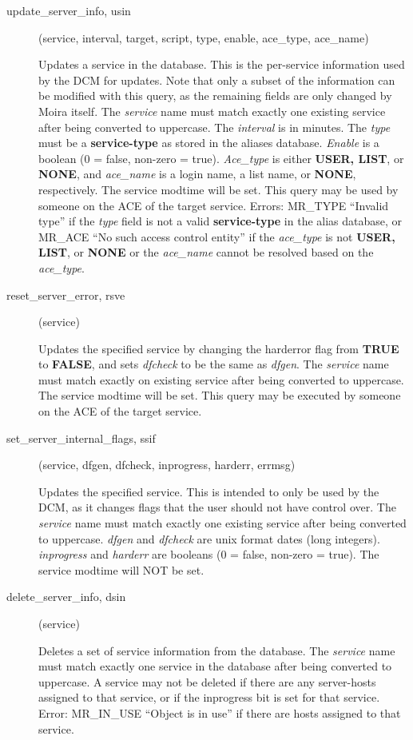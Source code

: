 \begin{description}
\item[update\_server\_info, usin](service, interval, target, script, type,
enable, ace\_type, ace\_name)

Updates a service in the database.  This is the per-service
information used by the DCM for updates.  Note that only a subset of
the information can be modified with this query, as the remaining
fields are only changed by Moira itself.  The {\em service} name must
match exactly one existing service after being converted to uppercase.
The {\em interval} is in minutes.  The {\em type} must be a
{\bf service-type} as stored in the aliases database.  {\em Enable} is a
boolean (0 = false, non-zero = true).  {\em Ace\_type} is either {\bf USER,
LIST}, or {\bf NONE}, and {\em ace\_name} is a login name, a list name, or
{\bf NONE}, respectively.  The service modtime will be set.  This query
may be used by someone on the ACE of the target service.  Errors:
MR\_TYPE ``Invalid type'' if the {\em type} field is not a valid
{\bf service-type} in the alias database, or MR\_ACE ``No such access
control entity'' if the {\em ace\_type} is not {\bf USER, LIST}, or {\bf NONE}
or the {\em ace\_name} cannot be resolved based on the {\em ace\_type}.

\item[reset\_server\_error, rsve](service)

Updates the specified service by changing the harderror flag from
{\bf TRUE} to {\bf FALSE}, and sets {\em dfcheck} to be the same as
{\em dfgen}.  The {\em service} name must match exactly on existing
service after being converted to uppercase.  The service modtime will
be set.  This query may be executed by someone on the ACE of the
target service.

\item[set\_server\_internal\_flags, ssif](service, dfgen, dfcheck,
inprogress, harderr, errmsg)

Updates the specified service.  This is intended to only be used by
the DCM, as it changes flags that the user should not have control
over.  The {\em service} name must match exactly one existing service
after being converted to uppercase.  {\em dfgen} and {\em dfcheck} are
unix format dates (long integers).  {\em inprogress} and {\em harderr} are
booleans (0 = false, non-zero = true).  The service modtime will NOT
be set.

\item[delete\_server\_info, dsin](service)

Deletes a set of service information from the database.  The
{\em service} name must match exactly one service in the database after
being converted to uppercase.  A service may not be deleted if there
are any server-hosts assigned to that service, or if the inprogress
bit is set for that service.  Error: MR\_IN\_USE ``Object is in use'' if
there are hosts assigned to that service.


\end{description}
